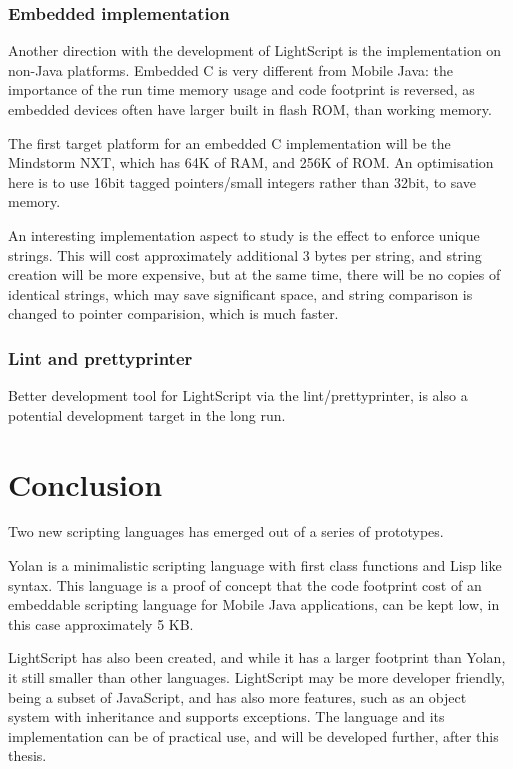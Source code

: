 \documentclass[11pt]{report}
\begin{document}
\subsection{Embedded implementation}

Another direction with the development of LightScript is the implementation on non-Java platforms.
Embedded C is very different from Mobile Java: the importance of the run time memory usage and code footprint is reversed, as embedded devices often have larger built in flash ROM, than working memory.

The first target platform for an embedded C implementation will be the Mindstorm NXT, which has 64K of RAM, and 256K of ROM.
An optimisation here is to use 16bit tagged pointers/small integers rather than 32bit, to save memory. 

An interesting implementation aspect to study is the effect to enforce unique strings. This will cost approximately additional 3 bytes per string, and string creation will be more expensive, but at the same time, there will be no copies of identical strings, which may save significant space, and string comparison is changed to pointer comparision, which is much faster.

\subsection{Lint and prettyprinter}
Better development tool for LightScript via the lint/prettyprinter,
is also a potential development target in the long run.

\chapter{Conclusion}
\label{conclusion}
Two new scripting languages has emerged out of a series of prototypes.

Yolan is a minimalistic scripting language with first class functions and Lisp like syntax. This language is a proof of concept that the code footprint cost of an embeddable scripting language for Mobile Java applications, can be kept low, in this case approximately 5 KB.

LightScript has also been created, and while it has a larger footprint than Yolan, it still smaller than other languages. LightScript may be more developer friendly, being a subset of JavaScript, and has also more features, such as an object system with inheritance and supports exceptions.
The language and its implementation can be of practical use, and will be developed further, after this thesis.
\end{document}

